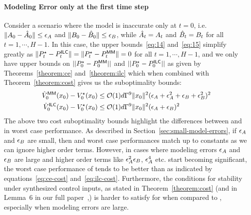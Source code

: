 \paragraph{Modeling Error only at the first time step}
\label{sec:modeling-error-only}

Consider a scenario where the model is inaccurate only at $t=0$,
i.e. $\|A_0 - \hat{A}_0\|\leq\epsilon_A$ and 
$\|B_0 - \hat{B}_0\|\leq\epsilon_B$, while $\hat{A}_t = A_t$ and $\hat{B}_t =
B_t$ for all $t=1, \cdots, H-1$. In this case, the upper
bounds~\eqref{eq:14} and~\eqref{eq:15} simplify greatly as $\|P^\star_t
- P^\mathsf{ILC}_t\| = \|P^\star_t - P^\mathsf{MM}_t\| = 0$ for all $t=1, \cdots, H-1$,
and we only have upper bounds on $||P^\star_0 - P^\mathsf{MM}_0||$ and $||P^\star_0
- P^\mathsf{ILC}_0||$ as given by Theorems~\ref{theorem:ce}
and~\ref{theorem:ilc} which when combined with
Theorem~\ref{theorem:cost} gives us the suboptimality bounds:
\begin{align}
  \hat{V}_0^{\mathsf{MM}}(x_0) - V_0^\star(x_0) &\leq
  \mathcal{O}(1)d\Gamma^9\|x_0\|^2(\epsilon_A + \epsilon_A^2 + \epsilon_B +
                                                \epsilon_B^2)^2 \label{eq:ce-cost}\\
  \hat{V}_0^{\mathsf{ILC}}(x_0) - V_0^\star(x_0) &\leq
  \mathcal{O}(1)d\Gamma^9\|x_0\|^2(\epsilon_A + \epsilon_B)^2\label{eq:ilc-cost}                                                
\end{align}
The above two cost suboptimality bounds highlight the differences
between \MM{} and \ILC{} in worst case performance. As described in
Section~\ref{sec:small-model-errors}, if $\epsilon_A$ and $\epsilon_B$ are
small, then \MM{} and \ILC{} worst case performances match up to constants as
we can ignore higher order terms.
However, in cases where modeling errors $\epsilon_A$ and $\epsilon_B$ are large
and higher order terms like $\epsilon_A^2\epsilon_B$, $\epsilon_A^4$ etc. start
becoming significant, the worst case performance of \ILC{} tends to be
better than \MM{} as indicated by equations~\eqref{eq:ce-cost}
and~\eqref{eq:ilc-cost}. Furthermore, the conditions for stability
under synthesized control inputs, as
stated in Theorem~\ref{theorem:cost} (and in
Lemma~6 in our full paper~\cite{DBLP:journals/corr/abs-2111-09434},) is harder to satisfy for \MM{}
when compared to \ILC{}, especially when modeling errors are large.

